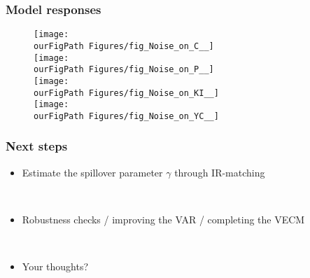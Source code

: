 \documentclass{beamer}
\def \ourFigPath {../../}
\begin{document}
\begin{frame}
\frametitle{Model responses}

\vspace{-0.2cm}
\begin{figure}
\begin{multicols}{2}
\centering 
\texttt{[image: \\ourFigPath Figures/fig\_Noise\_on\_C\_\_]}\\
\vspace{0.3cm}
\texttt{[image: \\ourFigPath Figures/fig\_Noise\_on\_P\_\_]}\\ 
\vspace{0.3cm}
\texttt{[image: \\ourFigPath Figures/fig\_Noise\_on\_KI\_\_]}\\ 
\vspace{0.3cm}
\texttt{[image: \\ourFigPath Figures/fig\_Noise\_on\_YC\_\_]}\\ 
\end{multicols}
\end{figure}


\end{frame}


\begin{frame}
\frametitle{Next steps}

\begin{itemize}
\item Estimate the spillover parameter $\gamma$ through IR-matching

\

\item Robustness checks / improving the VAR / completing the VECM

\

\item Your thoughts?
\end{itemize}


\end{frame}


\end{document}
